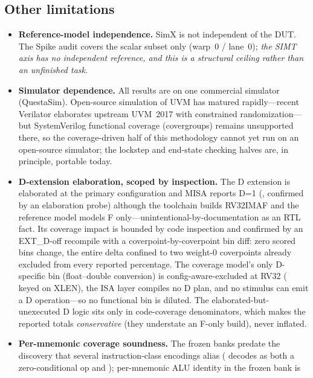 \documentclass[conference]{IEEEtran}
\newcommand{\code}[1]{\texttt{\detokenize{#1}}}
\begin{document}
\subsection{Other limitations}
\begin{itemize}
	\item \textbf{Reference-model independence.} SimX is not independent of
	      the DUT. The Spike audit covers the scalar subset only (warp~0 /
	      lane~0); \emph{the SIMT axis has no independent reference, and this is a
		      structural ceiling rather than an unfinished task.}
	\item \textbf{Simulator dependence.} All results are on one commercial
	      simulator (QuestaSim). Open-source simulation of UVM has matured
	      rapidly---recent Verilator elaborates upstream UVM~2017 with
	      constrained randomization---but SystemVerilog functional coverage
	      (covergroups) remains unsupported there, so the coverage-driven
	      half of this methodology cannot yet run on an open-source
	      simulator; the lockstep and end-state checking halves are, in
	      principle, portable today.
	\item \textbf{D-extension elaboration, scoped by inspection.} The D
	      extension is elaborated at the
	      primary configuration and MISA reports D=1 (\code{FLEN=64}, confirmed by
	      an elaboration probe) although the toolchain builds RV32IMAF and the
	      reference model models F only---unintentional-by-documentation as an
	      RTL fact. Its coverage impact is bounded by code inspection and
	      confirmed by an EXT\_D-off recompile with a
	      coverpoint-by-coverpoint bin diff: zero scored bins change, the
	      entire delta confined to two weight-0 coverpoints already excluded
	      from every reported percentage. The
	      coverage model's only D-specific bin (float--double conversion) is
	      config-aware-excluded at RV32 (\code{ignore\_bins} keyed on XLEN), the
	      ISA layer compiles no D plan, and no stimulus can emit a D
	      operation---so no functional bin is diluted. The
	      elaborated-but-unexecuted D logic sits only in code-coverage
	      denominators, which makes the reported totals \emph{conservative}
	      (they understate an F-only build), never inflated.
	\item \textbf{Per-mnemonic coverage soundness.} The frozen banks
	      predate the discovery that several instruction-class encodings alias
	      (\code{4'b1011} decodes as both a zero-conditional op and
	      \code{EBREAK}); per-mnemonic ALU identity in the frozen bank is

\end{itemize}
\end{document}
